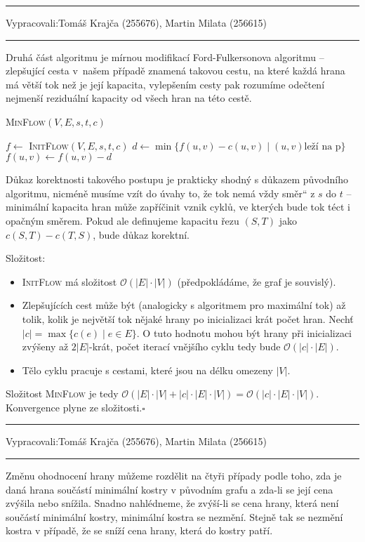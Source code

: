 \documentclass[12pt]{article}
\newcommand{\la}{\leftarrow}
\newcommand{\uv}[1]{\quotedblbase #1\textquotedblleft}
\renewcommand{\O}{\mathcal{O}}
\newcommand{\zadani}[2]{
{\large
\noindent {\bf IB108 \hfill{} Sada #1, Příklad #2 \\[-4mm]}
\noindent\hrule
\vspace{2mm}
\noindent Vypracovali:\hfill{}Tomáš Krajča (255676), Martin Milata (256615)
\vspace{3mm}
\hrule
\bigskip\bigskip}
}
\begin{document}

\clearpage
\zadani{3}{3}

\noindent
Druhá část algoritmu je mírnou modifikací Ford-Fulkersonova algoritmu -- zlepšující cesta v~našem
případě znamená takovou cestu, na které každá hrana má větší tok než je její kapacita,
vylepšením cesty pak rozumíme odečtení nejmenší reziduální kapacity od všech hran na této cestě.

\begin{algorithm}
\textsc{MinFlow}$(V,E,s,t,c)$
\begin{algorithmic}
\STATE $f \la $ \textsc{InitFlow}$(V,E,s,t,c)$
\STATE $d \la \min\{f(u,v) - c(u,v) \mid (u,v) \text{leží na p}\}$
\STATE $f(u,v) \la f(u,v) - d$
\ENDFOR
\ENDWHILE
\end{algorithmic}
\end{algorithm}

Důkaz korektnosti takového postupu je prakticky shodný s důkazem původního algoritmu, nicméně musíme
vzít do úvahy to, že tok nemá vždy \uv{směr} z $s$ do $t$ -- minimální kapacita hran může zapříčinit
vznik cyklů, ve kterých bude tok téct i opačným směrem. Pokud ale definujeme kapacitu řezu
$(S,T)$ jako $c(S,T) - c(T,S)$, bude důkaz korektní.

\noindent
Složitost:
\begin{itemize}
\item \textsc{InitFlow} má složitost $\O(|E|\cdot|V|)$ (předpokládáme, že graf je souvislý).
\item Zlepšujících cest může být (analogicky s algoritmem pro maximální tok) až tolik, kolik je
největší tok nějaké hrany po inicializaci krát počet hran.  Nechť $|c| = \max\{c(e) \mid e \in E\}$. O tuto hodnotu mohou být
hrany při inicializaci zvýšeny až $2|E|$-krát, počet iterací vnějšího cyklu tedy bude $\O(|c|\cdot|E|)$.
\item Tělo cyklu pracuje s cestami, které jsou na délku omezeny $|V|$.
\end{itemize}
Složitost \textsc{MinFlow} je tedy $\O(|E|\cdot|V| + |c|\cdot|E|\cdot|V|) =
\O(|c|\cdot|E|\cdot|V|)$. Konvergence plyne ze složitosti.\hfill$\square$



\clearpage
\zadani{3}{4}

\noindent
Změnu ohodnocení hrany můžeme rozdělit na čtyři případy podle toho, zda je daná hrana součástí
minimální kostry v původním grafu a zda-li se její cena zvýšila nebo snížila.  Snadno nahlédneme, že
zvýší-li se cena hrany, která není součástí minimální kostry, minimální kostra se nezmění. Stejně
tak se nezmění kostra v případě, že se sníží cena hrany, která do kostry patří.
\end{document}
